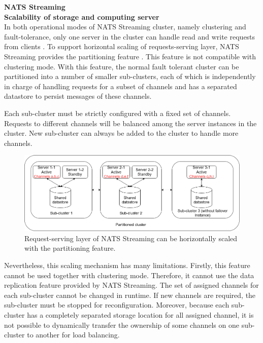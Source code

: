 \large \textbf{NATS Streaming}\\
\normalsize
\textbf{Scalability of storage and computing server}\\
In both operational modes of NATS Streaming cluster, namely clustering and fault-tolerance, only one server in the cluster can handle read and write requests from clients \cite{natsstreaming}. To support horizontal scaling of requests-serving layer, NATS Streaming provides the partitioning feature \cite{natspartitioning}. This feature is not compatible with clustering mode. With this feature, the normal fault tolerant cluster can be partitioned into a number of smaller sub-clusters, each of which is independently in charge of handling requests for a subset of channels and has a separated datastore to persist messages of these channels. 

Each sub-cluster must be strictly configured with a fixed set of channels. Requests to different channels will be balanced among the server instances in the cluster. New sub-cluster can always be added to the cluster to handle more channels. 
\begin{figure}[h]
	\centering
	\includegraphics[width=\linewidth]{images/scalability-nats.png}
	\caption{Request-serving layer of NATS Streaming can be horizontally scaled with the partitioning feature.}
	\label{fig:scalabilitynats}
\end{figure}

Nevertheless, this scaling mechanism has many limitations. Firstly, this feature cannot be used together with clustering mode. Therefore, it cannot use the data replication feature provided by NATS Streaming. The set of assigned channels for each sub-cluster cannot be changed in runtime. If new channels are required, the sub-cluster must be stopped for reconfiguration. Moreover, because each sub-cluster has a completely separated storage location for all assigned channel, it is not possible to dynamically transfer the ownership of some channels on one sub-cluster to another for load balancing.
 

